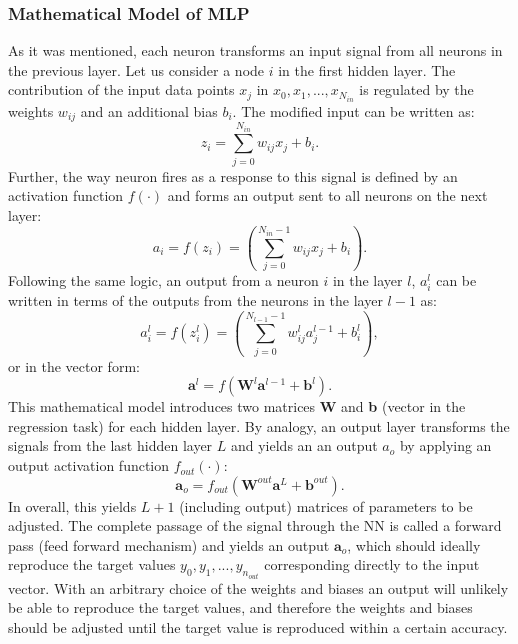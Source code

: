 \documentclass{emulateapj}
\begin{document}
\subsubsection{Mathematical Model of MLP}
\label{subsubsec: MLP}

As it was mentioned, each neuron transforms an input signal from all neurons in the previous layer. Let us consider a node $i$ in the first hidden layer. The contribution of the input data points $x_j$ in $x_0, x_1, ..., x_{N_{in}}$ is regulated by the weights $w_{ij}$ and an additional bias $b_i$. The modified input can be written as:
\begin{equation}
\label{eq: 1}
    z_i = \sum_{j=0}^{N_{in}}w_{ij}x_j +b_i.
\end{equation}
Further, the way neuron fires as a response to this signal is defined by an activation function $f(\cdot)$ and forms an output sent to all neurons on the next layer:
\begin{equation}
    a_i = f\left(z_i\right)=\left(\sum_{j=0}^{N_{in}-1}w_{ij}x_j +b_i\right).
\end{equation}
Following the same logic, an output from a neuron $i$ in the layer $l$, $a_i^l$ can be written in terms of the outputs from the neurons in the layer $l-1$ as:
\begin{equation}
    a_i^l = f\left(z_i^l\right)=\left(\sum_{j=0}^{N_{l-1}-1}w_{ij}^la_j^{l-1} +b_i^l\right),
\end{equation}
or in the vector form:
\begin{equation}
    \textbf{a}^l=f(\textbf{W}^l\textbf{a}^{l-1}+\textbf{b}^l).
\end{equation}
This mathematical model introduces two matrices \textbf{W} and \textbf{b} (vector in the regression task) for each hidden layer. By analogy, an output layer transforms the signals from the last hidden layer $L$ and yields an an output $a_o$ by applying an output activation function $f_{out}(\cdot)$:
\begin{equation}
    \textbf{a}_o=f_{out}(\textbf{W}^{out}\textbf{a}^{L}+\textbf{b}^{out}).
\end{equation}
In overall, this yields $L+1$ (including output) matrices of parameters to be adjusted. The complete passage of the signal through the NN is called a forward pass (feed forward mechanism) and yields an output $\textbf{a}_o$, which should ideally reproduce the target values $y_0,y_1,...,y_{n_{out}}$ corresponding directly to the input vector. With an arbitrary choice of the weights and biases an output will unlikely be able to reproduce the target values, and therefore the weights and biases should be adjusted until the target value is reproduced within a certain accuracy.
\end{document}
